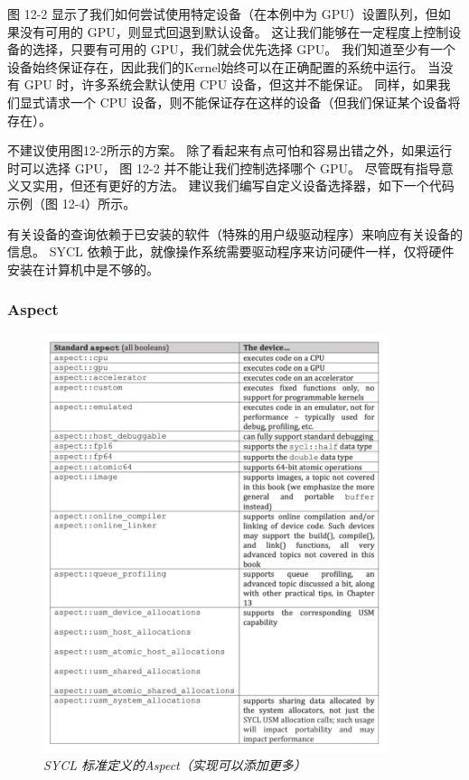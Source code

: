 图 12-2 显示了我们如何尝试使用特定设备（在本例中为 GPU）设置队列，但如果没有可用的 GPU，则显式回退到默认设备。 
这让我们能够在一定程度上控制设备的选择，只要有可用的 GPU，我们就会优先选择 GPU。 
我们知道至少有一个设备始终保证存在，因此我们的Kernel始终可以在正确配置的系统中运行。 
当没有 GPU 时，许多系统会默认使用 CPU 设备，但这并不能保证。 
同样，如果我们显式请求一个 CPU 设备，则不能保证存在这样的设备（但我们保证某个设备将存在）。

不建议使用图12-2所示的方案。 除了看起来有点可怕和容易出错之外，如果运行时可以选择 GPU，
图 12-2 并不能让我们控制选择哪个 GPU。 尽管既有指导意义又实用，但还有更好的方法。 
建议我们编写自定义设备选择器，如下一个代码示例（图 12-4）所示。

有关设备的查询依赖于已安装的软件（特殊的用户级驱动程序）来响应有关设备的信息。 
SYCL 依赖于此，就像操作系统需要驱动程序来访问硬件一样，仅将硬件安装在计算机中是不够的。

\subsubsection{Aspect}
\begin{figure}[H]
	\centering
	\includegraphics[width=0.9\textwidth]{figs/F12.3.png}
	\caption{\textit{SYCL 标准定义的Aspect（实现可以添加更多） }}
\end{figure}

